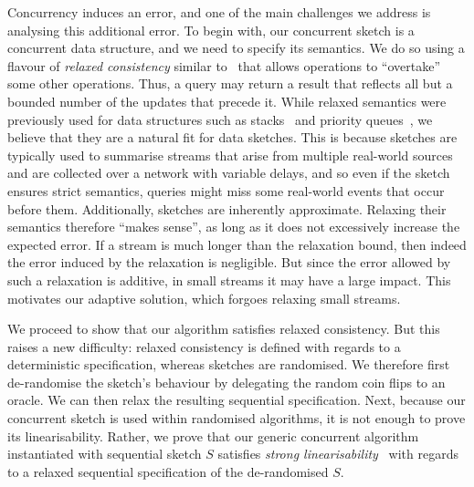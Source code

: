 Concurrency induces an error, and one of the main challenges we address is analysing this additional error.
To begin with, our concurrent sketch is a concurrent data structure, and 
we need to specify its  semantics. We do so using a flavour of 
\emph{relaxed consistency} similar to~\cite{Henzinger, alistarh2018distributionally}    
that allows operations to ``overtake'' some other operations.  
Thus, a query may return a result that reflects all but a bounded number of the updates
that precede it. 
While relaxed semantics were previously used for data structures such as stacks~\cite{Henzinger}
and priority queues~\cite{alistarh, rihani2014multiqueues}, we believe that they are a natural fit for data sketches. 
This is because sketches are typically used to summarise streams that  arise from multiple real-world sources  
and are collected over a network with variable delays, and so even if the sketch ensures strict semantics, 
queries might miss some real-world events that occur before them. Additionally, sketches are inherently approximate.
Relaxing their semantics therefore ``makes sense'', as long as it does not excessively increase the expected error.
If a stream is much longer than the relaxation bound, then indeed the error induced by the relaxation is negligible. But since the error allowed by such
a relaxation is additive, in small streams it may have a large impact. This motivates our adaptive solution, which forgoes relaxing small streams. 


We proceed to show that our algorithm satisfies relaxed consistency. 
But this raises a new difficulty: 
relaxed consistency is defined with regards to a deterministic specification, whereas sketches are randomised.
We therefore first de-randomise the sketch's behaviour
by delegating the random coin flips to an oracle. We can then relax the resulting sequential specification.
Next, because our concurrent sketch is used within randomised algorithms, 
it is not enough to prove its linearisability. Rather, 
we prove that our generic concurrent algorithm instantiated with sequential sketch $S$
satisfies \emph{strong linearisability}~\cite{Wojciech} with regards to a relaxed sequential specification of the de-randomised $S$.
 

